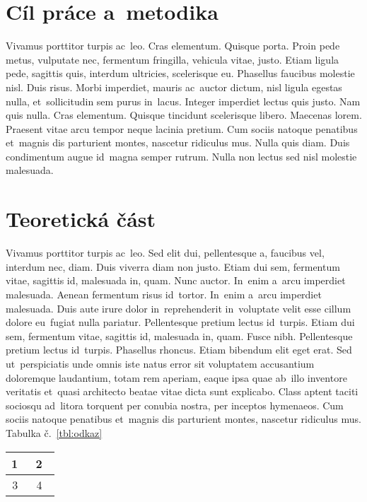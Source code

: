\section{Cíl práce a~metodika}
Vivamus porttitor turpis ac~leo. Cras elementum. Quisque porta. Proin pede metus, vulputate nec, fermentum fringilla, vehicula vitae, justo. Etiam ligula pede, sagittis quis, interdum ultricies, scelerisque eu. Phasellus faucibus molestie nisl. Duis risus. Morbi imperdiet, mauris ac~auctor dictum, nisl ligula egestas nulla, et~sollicitudin sem purus in~lacus. Integer imperdiet lectus quis justo. Nam quis nulla. Cras elementum. Quisque tincidunt scelerisque libero. Maecenas lorem. Praesent vitae arcu tempor neque lacinia pretium. Cum sociis natoque penatibus et~magnis dis parturient montes, nascetur ridiculus mus. Nulla quis diam. Duis condimentum augue id~magna semper rutrum. Nulla non lectus sed nisl molestie malesuada.

\section{Teoretická část}

Vivamus porttitor turpis ac~leo. Sed elit dui, pellentesque a, faucibus vel, interdum nec, diam. Duis viverra diam non justo. Etiam dui sem, fermentum vitae, sagittis id, malesuada in, quam. Nunc auctor. In~enim a~arcu imperdiet malesuada. Aenean fermentum risus id~tortor. In~enim a~arcu imperdiet malesuada. Duis aute irure dolor in~reprehenderit in~voluptate velit esse cillum dolore eu~fugiat nulla pariatur. Pellentesque pretium lectus id~turpis. Etiam dui sem, fermentum vitae, sagittis id, malesuada in, quam. Fusce nibh. Pellentesque pretium lectus id~turpis. Phasellus rhoncus. Etiam bibendum elit eget erat. Sed ut~perspiciatis unde omnis iste natus error sit voluptatem accusantium doloremque laudantium, totam rem aperiam, eaque ipsa quae ab~illo inventore veritatis et~quasi architecto beatae vitae dicta sunt explicabo. Class aptent taciti sociosqu ad~litora torquent per conubia nostra, per inceptos hymenaeos. Cum sociis natoque penatibus et~magnis dis parturient montes, nascetur ridiculus mus. Tabulka č.~\ref{tbl:odkaz}

\begin{centering}
  \begin{tabular}{|c|c|}
    \hline
    1~& 2~\\
    \hline
    3~& 4~\\
    \hline
  \end{tabular}
  \label{tbl:odkaz}
\end{centering}

